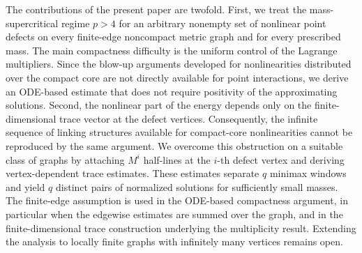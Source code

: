 \documentclass[11pt]{amsart}
\numberwithin{equation}{section}
\begin{document}
The contributions of the present paper are twofold. First, we treat the mass-supercritical regime $p>4$ for an arbitrary nonempty set of nonlinear point defects on every finite-edge noncompact metric graph and for every prescribed mass. The main compactness difficulty is the uniform control of the Lagrange multipliers. Since the blow-up arguments developed for nonlinearities distributed over the compact core are not directly available for point interactions, we derive an ODE-based estimate that does not require positivity of the approximating solutions. Second, the nonlinear part of the energy depends only on the finite-dimensional trace vector at the defect vertices. Consequently, the infinite sequence of linking structures available for compact-core nonlinearities cannot be reproduced by the same argument. We overcome this obstruction on a suitable class of graphs by attaching $M^i$ half-lines at the $i$-th defect vertex and deriving vertex-dependent trace estimates. These estimates separate $q$ minimax windows and yield $q$ distinct pairs of normalized solutions for sufficiently small masses. The finite-edge assumption is used in the ODE-based compactness argument, in particular when the edgewise estimates are summed over the graph, and in the finite-dimensional trace construction underlying the multiplicity result. Extending the analysis to locally finite graphs with infinitely many vertices remains open.
\end{document}
